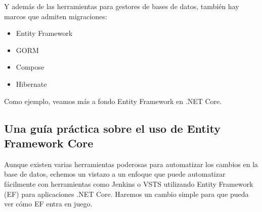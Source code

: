 \documentclass[twoside,twocolumn]{article}
\begin{document}
Y además de las herramientas para gestores de bases de datos, también hay marcos que admiten migraciones:

\begin{itemize}
\item Entity Framework
\item GORM
\item Compose
\item Hibernate
\end{itemize}

Como ejemplo, veamos más a fondo Entity Framework en .NET Core.

\subsection{Una guía práctica sobre el uso de Entity Framework Core}
Aunque existen varias herramientas poderosas para automatizar los cambios en la base de datos, echemos un vistazo a un enfoque que puede automatizar fácilmente con herramientas como Jenkins o VSTS utilizando Entity Framework (EF) para aplicaciones .NET Core.
Haremos un cambio simple para que pueda ver cómo EF entra en juego.
\end{document}
